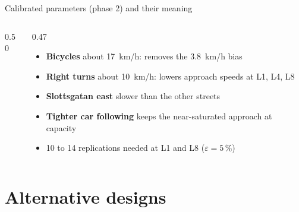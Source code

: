 \documentclass[aspectratio=169,10pt]{beamer}
\newcommand{\hl}[1]{\textcolor{accent}{\textbf{#1}}}
\begin{document}
\begin{frame}{Calibrated parameters (phase 2) and their meaning}
\begin{columns}[T]
\begin{column}{0.50\textwidth}
\footnotesize
{}
\end{column}
\begin{column}{0.47\textwidth}
\small
\begin{itemize}\setlength{\itemsep}{5pt}
  \item \hl{Bicycles} about 17~km/h: removes the 3.8~km/h bias
  \item \hl{Right turns} about 10~km/h: lowers approach speeds at L1, L4, L8
  \item \hl{Slottsgatan east} slower than the other streets
  \item \hl{Tighter car following} keeps the near-saturated approach at capacity
  \item 10 to 14 replications needed at L1 and L8 ($\varepsilon = 5\,\%$)
\end{itemize}
\end{column}
\end{columns}
\end{frame}

\section{Alternative designs}
\end{document}
